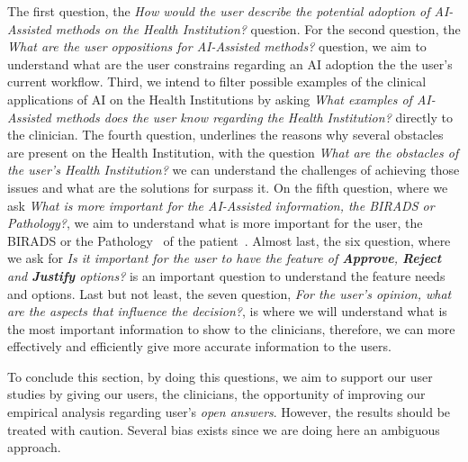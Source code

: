 The first question, the \textit{How would the user describe the potential adoption of \textit{AI-Assisted} methods on the Health Institution?} question. For the second question, the \textit{What are the user oppositions for \textit{AI-Assisted} methods?} question, we aim to understand what are the user constrains regarding an AI adoption the the user's current workflow. Third, we intend to filter possible examples of the clinical applications of AI on the Health Institutions by asking \textit{What examples of \textit{AI-Assisted} methods does the user know regarding the Health Institution?} directly to the clinician. The fourth question, underlines the reasons why several obstacles are present on the Health Institution, with the question \textit{What are the obstacles of the user's Health Institution?} we can understand the challenges of achieving those issues and what are the solutions for surpass it. On the fifth question, where we ask \textit{What is more important for the \textit{AI-Assisted} information, the BIRADS or Pathology?}, we aim to understand what is more important for the user, the BIRADS or the Pathology~\cite{maicas2018pre} of the patient~\cite{elverici2015nonpalpable}. Almost last, the six question, where we ask for \textit{Is it important for the user to have the feature of \textbf{Approve}, \textbf{Reject} and \textbf{Justify} options?} is an important question to understand the feature needs and options. Last but not least, the seven question, \textit{For the user's opinion, what are the aspects that influence the decision?}, is where we will understand what is the most important information to show to the clinicians, therefore, we can more effectively and efficiently give more accurate information to the users.

To conclude this section, by doing this questions, we aim to support our user studies by giving our users, the clinicians, the opportunity of improving our empirical analysis regarding user's \textit{open answers}. However, the results should be treated with caution. Several bias exists since we are doing here an ambiguous approach.

\clearpage